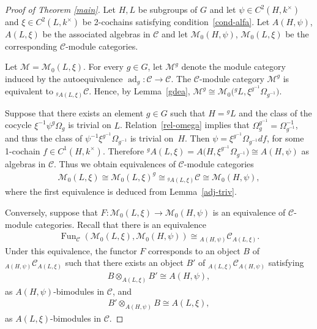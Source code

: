 \documentclass[11pt]{article}
\numberwithin{equation}{section}
\newcommand{\cch}{\Omega}
\newcommand{\C}{{\mathcal C}}
\newcommand{\M}{{\mathcal M}}
\newcommand{\1}{\textbf{1}}
\newcommand\ad{\operatorname{ad}}
\newcommand\Fun{\operatorname{Fun}}
\begin{document}
\begin{proof}[Proof of Theorem \ref{main}] Let $H, L$ be subgroups of $G$ and let $\psi \in C^2(H, k^{\times})$ and $\xi \in C^2(L, k^{\times})$ be 2-cochains satisfying condition~\eqref{cond-alfa}. Let $A(H, \psi)$, $A(L, \xi)$ be the associated algebras in $\C$ and let $\M_0(H, \psi)$, $\M_0(L, \xi)$ be the corresponding $\C$-module categories.

Let $\M = \M_0(L, \xi)$. For every $g \in G$, let $\M^g$ denote the module category induced by the autoequivalence $\ad_g\colon \C \to \C$.
The $\C$-module category $\M^g$ is equivalent to $_{^gA(L, \xi)}\C$. Hence, by Lemma~\ref{gdea}, $\M^g \cong \M_0\big({}^gL, \xi^{g^{-1}} \cch_{g^{-1}}\big)$.

Suppose that there exists an element $g \in G$ such that $H = {}^gL$ and the class of the cocycle $\xi^{-1}\psi^g\cch_g$ is trivial on $L$. Relation~\eqref{rel-omega} implies that $\cch_g^{g^{-1}} = \cch_{g^{-1}}^{-1}$, and thus the class of $\psi^{-1}\xi^{g^{-1}}\cch_{g^{-1}}$ is trivial on~$H$. Then $\psi = \xi^{g^{-1}}\cch_{g^{-1}} df$, for some 1-cochain $f \in C^1(H, k^{\times})$. Therefore $^gA(L, \xi) = A\big(H, \xi^{g^{-1}} \cch_{g^{-1}}\big) \cong A(H, \psi)$ as algebras in $\C$. Thus we obtain equivalences of $\C$-module categories
\begin{gather*}\M_0(L, \xi) \cong \M_0(L, \xi)^g \cong {} _{^gA(L, \xi)}\C \cong \M_0(H, \psi),\end{gather*}
where the f\/irst equivalence is deduced from Lemma~\ref{adj-triv}.

Conversely, suppose that $F\colon \M_0(L, \xi) \to \M_0(H, \psi)$ is an equivalence of $\C$-module categories. Recall that there is an equivalence
\begin{gather*}\label{equiv-fun-1} \Fun_\C\left(\M_0(L, \xi), \M_0(H, \psi)\right) \cong {} _{A(H, \psi)}\C_{A(L, \xi)}.\end{gather*}
Under this equivalence, the functor $F$ corresponds to an object $B$ of $_{A(H, \psi)}\C_{A(L, \xi)}$ such that there exists an object $B'$ of $_{A(L, \xi)}\C_{A(H, \psi)}$ satisfying
\begin{gather}\label{dim-b}B \otimes_{A(L, \xi)}B' \cong A(H, \psi),\end{gather} as $A(H, \psi)$-bimodules in $\C$, and
\begin{gather}\label{bbprime}B' \otimes_{A(H, \psi)}B \cong A(L, \xi), \end{gather} as $A(L, \xi)$-bimodules in $\C$.


\end{proof}
\end{document}
